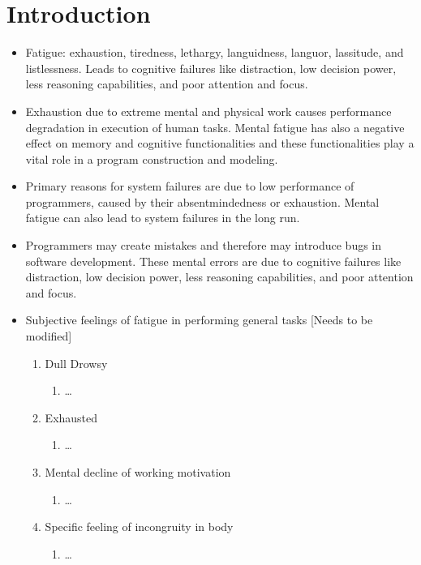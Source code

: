 \documentclass{acm_proc_article-sp}
\begin{document}
\section{Introduction}
\begin{itemize}
  \item Fatigue: exhaustion, tiredness, lethargy, languidness, languor,
  lassitude, and listlessness. Leads to cognitive failures like distraction, low
  decision power, less reasoning capabilities, and poor attention and focus.
  \cite{larson:cogFailures}
  \item Exhaustion due to extreme mental and physical work causes performance
  degradation in execution of human tasks. Mental fatigue has also a negative
  effect on memory and cognitive functionalities and these functionalities play
  a vital role in a program construction and modeling.
  \cite{schneiderman:interaction}
  \item Primary reasons for system failures are due to low performance of programmers,
  caused by their absentmindedness or exhaustion. Mental fatigue can also lead
  to system failures in the long run.
  \item Programmers may create mistakes and therefore may introduce bugs in
  software development. These mental errors are due to cognitive failures like
  distraction, low decision power, less reasoning capabilities, and poor
  attention and focus. \cite{larson:cogFailures}
  \item Subjective feelings of fatigue in performing general tasks [Needs to be
  modified]
  \cite{saito:industry}
  \begin{enumerate}
   		\item Dull Drowsy
   		\begin{enumerate}
   		  \item \ldots
   		\end{enumerate}
   		\item Exhausted
   		\begin{enumerate}
   		  \item \ldots
   		\end{enumerate}
   		\item Mental decline of working motivation
   		\begin{enumerate}
   		  \item \ldots
   		\end{enumerate}
   		\item Specific feeling of incongruity in body
   		\begin{enumerate}
   		  \item \ldots

\end{enumerate}
\end{enumerate}
\end{itemize}
\end{document}
